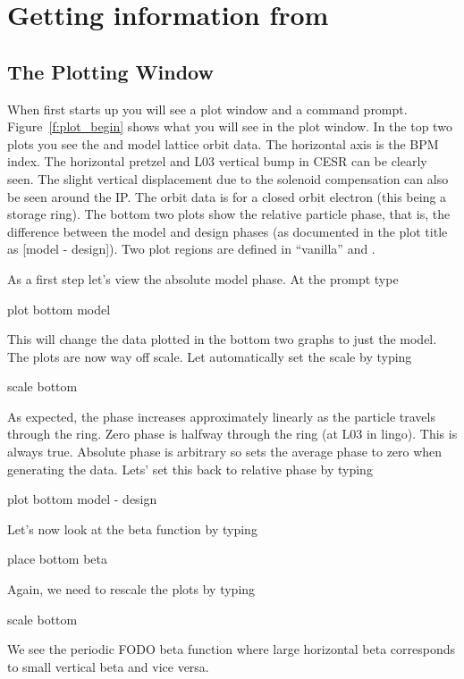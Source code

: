 \section{Getting information from \tao}
\label{s:get_info}

\subsection{The Plotting Window}

When \tao first starts up you will see a plot window and a command prompt.
Figure~\ref{f:plot_begin} shows what you will see in the plot window. In the top
two plots you see the  and  model lattice orbit data. The horizontal
axis is the \cesr BPM index. The horizontal pretzel and L03 vertical bump in
CESR can be clearly seen. The slight vertical displacement due to the solenoid
compensation can also be seen around the IP. The orbit data is for a closed
orbit electron (this being a storage ring). The bottom two plots show the
relative particle phase, that is, the difference between the model and design
phases (as documented in the plot title as [model - design]). Two plot regions
are defined in ``vanilla'' \tao {} and .

As a first step let's view the absolute model phase. At the  prompt type
\begin{example}
  plot bottom model
\end{example}
This will change the data plotted in the bottom two graphs to just the model.
The plots are now way off scale. Let \tao automatically set the scale by typing
\begin{example}
  scale bottom
\end{example}
As expected, the phase increases approximately linearly as the particle travels
through the ring. Zero phase is halfway through the ring (at L03 in \cesr lingo).
This is always true. Absolute phase is arbitrary so \tao sets the average
phase to zero when generating the data. Lets' set this back to relative
phase by typing
\begin{example}
  plot bottom model - design
\end{example}


Let's now look at the beta function by typing
\begin{example}
  place bottom beta
\end{example}
Again, we need to rescale the plots by typing
\begin{example}
  scale bottom
\end{example}
We see the periodic FODO beta function where large horizontal beta corresponds to
small vertical beta and vice versa.

